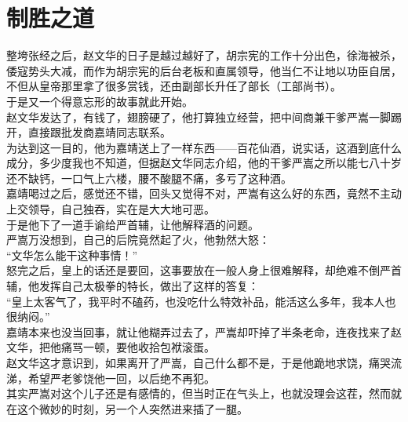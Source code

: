 \section{制胜之道}
\ifnum{}
	\begin{multicols}{\theparacolNo}
\fi
整垮张经之后，赵文华的日子是越过越好了，胡宗宪的工作十分出色，徐海被杀，倭寇势头大减，而作为胡宗宪的后台老板和直属领导，他当仁不让地以功臣自居，不但从皇帝那里拿了很多赏钱，还由副部长升任了部长（工部尚书）。\\

于是又一个得意忘形的故事就此开始。\\

赵文华发达了，有钱了，翅膀硬了，他打算独立经营，把中间商兼干爹严嵩一脚踢开，直接跟批发商嘉靖同志联系。\\

为达到这一目的，他为嘉靖送上了一样东西——百花仙酒，说实话，这酒到底什么成分，多少度我也不知道，但据赵文华同志介绍，他的干爹严嵩之所以能七八十岁还不缺钙，一口气上六楼，腰不酸腿不痛，多亏了这种酒。\\

嘉靖喝过之后，感觉还不错，回头又觉得不对，严嵩有这么好的东西，竟然不主动上交领导，自己独吞，实在是大大地可恶。\\

于是他下了一道手谕给严首辅，让他解释酒的问题。\\

严嵩万没想到，自己的后院竟然起了火，他勃然大怒：\\

“文华怎么能干这种事情！”\\

怒完之后，皇上的话还是要回，这事要放在一般人身上很难解释，却绝难不倒严首辅，他发挥自己太极拳的特长，做出了这样的答复：\\

“皇上太客气了，我平时不磕药，也没吃什么特效补品，能活这么多年，我本人也很纳闷。”\\

嘉靖本来也没当回事，就让他糊弄过去了，严嵩却吓掉了半条老命，连夜找来了赵文华，把他痛骂一顿，要他收拾包袱滚蛋。\\

赵文华这才意识到，如果离开了严嵩，自己什么都不是，于是他跪地求饶，痛哭流涕，希望严老爹饶他一回，以后绝不再犯。\\

其实严嵩对这个儿子还是有感情的，但当时正在气头上，也就没理会这茬，然而就在这个微妙的时刻，另一个人突然进来插了一腿。\\


\end{multicols}
